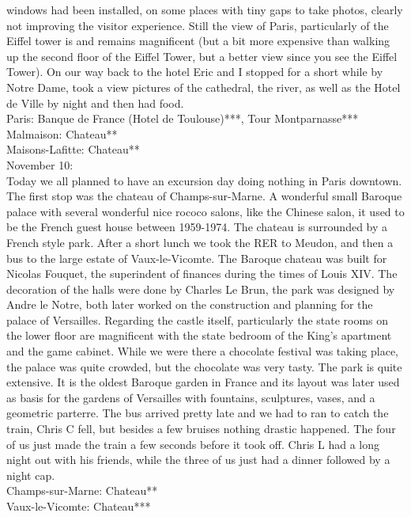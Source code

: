 windows had been installed, on some places with tiny gaps to take photos, clearly not improving the visitor experience. Still the view of Paris, particularly of the Eiffel tower is and remains magnificent (but a bit more expensive than walking up the second floor of the Eiffel Tower, but a better view since you see the Eiffel Tower). On our way back to the hotel Eric and I stopped for a short while by Notre Dame, took a view pictures of the cathedral, the river, as well as the Hotel de Ville by night and then had food.\\

Paris: Banque de France (Hotel de Toulouse)***, Tour Montparnasse***\\
Malmaison: Chateau**\\
Maisons-Lafitte: Chateau**\\

November 10:\\
Today we all planned to have an excursion day doing nothing in Paris downtown. The first stop was the chateau of Champs-sur-Marne. A wonderful small Baroque palace with several wonderful nice rococo salons, like the Chinese salon, it used to be the French guest house between 1959-1974. The chateau is surrounded by a French style park. After a short lunch we took the RER to Meudon, and then a bus to the large estate of Vaux-le-Vicomte. The Baroque chateau was built for Nicolas Fouquet, the superindent of finances during the times of Louis XIV. The decoration of the halls were done by Charles Le Brun, the park was designed by Andre le Notre, both later worked on the construction and planning for the palace of Versailles. Regarding the castle itself, particularly the state rooms on the lower floor are magnificent with the state bedroom of the King's apartment and the game cabinet. While we were there a chocolate festival was taking place, the palace was quite crowded, but the chocolate was very tasty. The park is quite extensive. It is the oldest Baroque garden in France and its layout was later used as basis for the gardens of Versailles with fountains, sculptures, vases, and a geometric parterre. The bus arrived pretty late and we had to ran to catch the train, Chris C fell, but besides a few bruises nothing drastic happened. The four of us just made the train a few seconds before it took off. Chris L had a long night out with his friends, while the three of us just had a dinner followed by a night cap.\\

Champs-sur-Marne: Chateau**\\
Vaux-le-Vicomte: Chateau***\\

